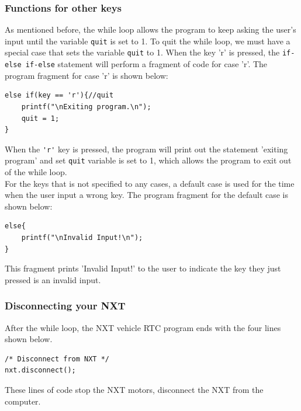 \documentclass[11pt]{article}
\begin{document}
\subsubsection*{Functions for other keys}
As mentioned before, the while loop allows the program to keep asking the user's input until the variable
\verb+quit+ is set to 1. To quit the while loop, we must have a special case that sets the variable \verb+quit+ to 1.
When the key 'r' is pressed, the \verb+if-else if-else+ statement will perform a fragment of code for case 'r'.
The program fragment for case 'r' is shown below:
\begin{verbatim}
else if(key == 'r'){//quit
    printf("\nExiting program.\n");
    quit = 1;
}
\end{verbatim}
\noindent
When the \verb+'r'+ key is pressed, the program will print out the statement 'exiting program' and set \verb+quit+
variable is set to 1, which allows the program to exit out of the while loop.\\
\newline
For the keys that is not specified to any cases, a default case is used for the time when the user input a wrong key.
The program fragment for the default case is shown below:
\begin{verbatim}
else{
    printf("\nInvalid Input!\n");
}
\end{verbatim}
\noindent
This fragment prints 'Invalid Input!' to the user to indicate the key they just pressed is an invalid input.

\subsubsection*{Disconnecting your NXT}
After the while loop, the NXT vehicle RTC program ends with the four lines shown below.

\begin{verbatim}
/* Disconnect from NXT */
nxt.disconnect();
\end{verbatim}

\noindent
These lines of code stop the NXT motors, disconnect the NXT from the computer.

\end{document}
